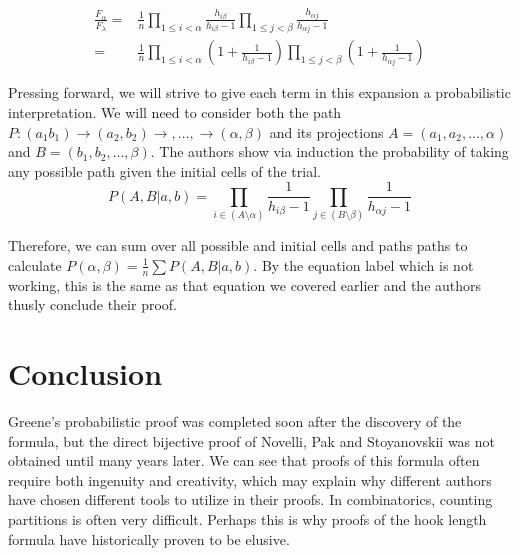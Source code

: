 \documentclass[11pt]{article}
\theoremstyle{definition}
\begin{document}
\begin{equation}
    \begin{split}
        \frac{F_\alpha}{F_\lambda} =& \frac{1}{n} \prod_{1 \leq i < \alpha} \frac{h_{i\beta}}{h_{i\beta} - 1} \prod_{1 \leq j < \beta} \frac{h_{\alpha j}}{h_{\alpha j} - 1}\\
        =& \frac{1}{n} \prod_{1 \leq i < \alpha} (1 + \frac{1}{h_{i\beta} - 1}) \prod_{1 \leq j < \beta} (1 + \frac{1}{h_{\alpha j} - 1})
    \end{split}
\end{equation}

Pressing forward, we will strive to give each term in this expansion a probabilistic interpretation. We will need to consider both the path $P:(a_1 b_1) \rightarrow (a_2,b_2) \rightarrow,\ldots,\rightarrow (\alpha,\beta)$ and its projections $A = (a_1,a_2,\ldots,\alpha)$ and $B = (b_1,b_2,\ldots,\beta)$. The authors show via induction the probability of taking any possible path given the initial cells of the trial.
\begin{equation}
P(A,B | a,b) = \prod_{i \in (A \setminus \alpha)} \frac{1}{h_{i\beta} - 1} \prod_{j \in (B \setminus \beta)} \frac{1}{h_{\alpha j} - 1}
\end{equation}

Therefore, we can sum over all possible and initial cells and paths paths to calculate $P(\alpha,\beta) = \frac{1}{n}\sum P(A,B|a,b)$. By the equation label which is not working, this is the same as that equation we covered earlier and the authors thusly conclude their proof.
\section{Conclusion}
Greene's probabilistic proof was completed soon after the discovery of the formula, but the direct bijective proof of Novelli, Pak and Stoyanovskii was not obtained until many years later. We can see that proofs of this formula often require both ingenuity and creativity, which may explain why different authors have chosen different tools to utilize in their proofs. In combinatorics, counting partitions is often very difficult. Perhaps this is why proofs of the hook length formula have historically proven to be elusive.



\end{document}
